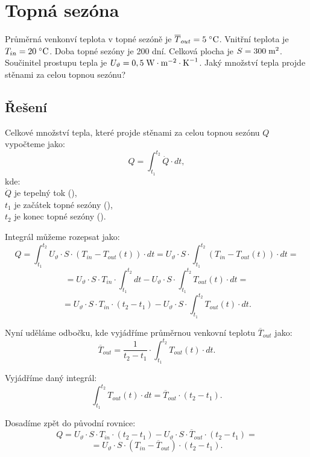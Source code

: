 \documentclass{article}
\begin{document}
\maketitle
\tableofcontents
\newpage




\section{ Topná sezóna \spicy \spicy \spicy}

Průměrná venkonví teplota v topné sezóně je $\overline{T}_{out} = 5 \; ^\circ \textrm{C}$. Vnitřní teplota je $T_{in} = 20 \; ^\circ \textrm{C}$. Doba topné sezóny je 200 dní. Celková plocha je $S = 300 \; \textrm{m}^{\textrm{2}}$. Součinitel prostupu tepla je $U_\vartheta = 0,5 \; \textrm{W} \cdot \textrm{m}^{-2} \cdot \textrm{K}^{-1}$. Jaký množství tepla projde stěnami za celou topnou sezónu?



\subsection{Řešení}

Celkové množství tepla, které projde stěnami za celou topnou sezónu $Q$ vypočteme jako:
$$
    Q = \int_{t_1}^{t_2} \dot{Q} \cdot dt,
$$
kde:\\
$\dot{Q}$ je tepelný tok (\ueqW),\\
$t_1$ je začátek topné sezóny (\uH),\\
$t_2$ je konec topné sezóny (\uH).

Integrál můžeme rozepsat jako:
$$
    Q = \int_{t_1}^{t_2} U_\vartheta \cdot S \cdot (T_{in} - T_{out} (t)) \cdot dt = U_\vartheta \cdot S \cdot \int_{t_1}^{t_2} (T_{in} - T_{out} (t)) \cdot dt =
$$
$$
    = U_\vartheta \cdot S \cdot T_{in} \cdot \int_{t_1}^{t_2} dt - U_\vartheta \cdot S \cdot \int_{t_1}^{t_2} T_{out} (t) \cdot dt =
$$
$$
    = U_\vartheta \cdot S \cdot T_{in} \cdot (t_2 - t_1) - U_\vartheta \cdot S \cdot \int_{t_1}^{t_2} T_{out} (t) \cdot dt.
$$

Nyní uděláme odbočku, kde vyjádříme průměrnou venkovní teplotu $\overline{T}_{out}$ jako:
$$
    \overline{T}_{out} = \frac{1}{t_2 - t_1} \cdot \int_{t_1}^{t_2} T_{out} (t) \cdot dt.
$$

Vyjádříme daný integrál:
$$
    \int_{t_1}^{t_2} T_{out} (t) \cdot dt = \overline{T}_{out} \cdot (t_2 - t_1).
$$

Dosadíme zpět do původní rovnice:
$$
    Q = U_\vartheta \cdot S \cdot T_{in} \cdot (t_2 - t_1) - U_\vartheta \cdot S \cdot \overline{T}_{out} \cdot (t_2 - t_1) =
$$
$$
    = U_\vartheta \cdot S \cdot (T_{in} - \overline{T}_{out}) \cdot (t_2 - t_1).
$$
\end{document}
